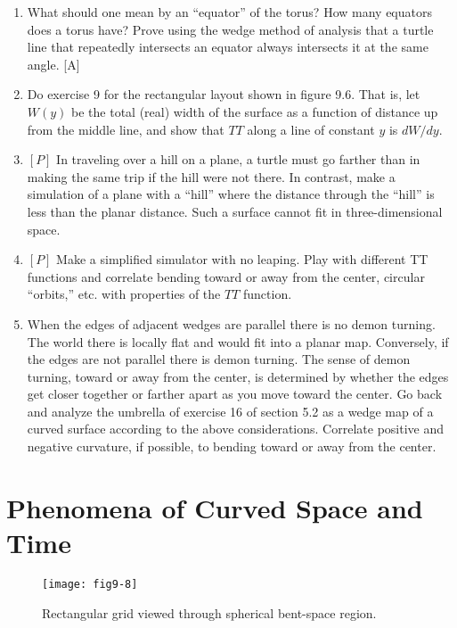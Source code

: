 \documentclass{book}
\begin{document}
\begin{enumerate}
\item What should one mean by an ``equator'' of the torus? How many
equators does a torus have? Prove using the wedge method of analysis
that a turtle line that repeatedly intersects an equator always intersects
it at the same angle. [A]

\item Do exercise 9 for the rectangular layout shown in figure 9.6. That is,
let $W(y)$ be the total (real) width of the surface as a function of distance
up from the middle line, and show that $TT$ along a line of constant $y$ is
$dW/dy$.

\item $[P]$ In traveling over a hill on a plane, a turtle must go farther
than in making the same trip if the hill were not there. In contrast,
make a simulation of a plane with a ``hill'' where the distance through
the ``hill'' is less than the planar distance. Such a surface cannot fit in
three-dimensional space.

\item $[P]$ Make a simplified simulator with no leaping. Play with different
TT functions and correlate bending toward or away from the center,
circular ``orbits,'' etc. with properties of the $TT$ function.

\item When the edges of adjacent wedges are parallel there is no demon
turning. The world there is locally flat and would fit into a planar map.
Conversely, if the edges are not parallel there is demon turning. The
sense of demon turning, toward or away from the center, is determined
by whether the edges get closer together or farther apart as you move
toward the center. Go back and analyze the umbrella of exercise 16 of
section 5.2 as a wedge map of a curved surface according to the above
considerations. Correlate positive and negative curvature, if possible, to
bending toward or away from the center.
\end{enumerate}

\section{Phenomena of Curved Space and Time}

\begin{figure}
\begin{center}
\texttt{[image: fig9-8]}
\caption{Rectangular grid viewed through spherical bent-space region.}
\end{center}
\end{figure}
\end{document}
